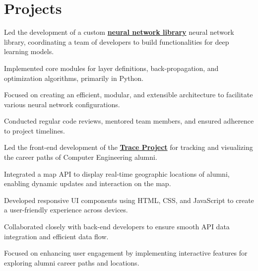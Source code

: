 \documentclass[]{deedy-resume-reversed}
\begin{document}
\begin{minipage}[t]{0.60\textwidth}

\section{Projects}
\begin{tightemize}
\item Led the development of a custom \textbf{\href{https://github.com/Dan1543/Neural-Network}{neural network library}} neural network library, coordinating a team of developers to build functionalities for deep learning models.
\item Implemented core modules for layer definitions, back-propagation, and optimization algorithms, primarily in Python.
\item Focused on creating an efficient, modular, and extensible architecture to facilitate various neural network configurations.
\item Conducted regular code reviews, mentored team members, and ensured adherence to project timelines.
\end{tightemize}
\sectionsep

\begin{tightemize}
\item Led the front-end development of the \textbf{\href{https://github.com/Proyecto-TRACE}{Trace Project}} for tracking and visualizing the career paths of Computer Engineering alumni.
\item Integrated a map API to display real-time geographic locations of alumni, enabling dynamic updates and interaction on the map.
\item Developed responsive UI components using HTML, CSS, and JavaScript to create a user-friendly experience across devices.
\item Collaborated closely with back-end developers to ensure smooth API data integration and efficient data flow.
\item Focused on enhancing user engagement by implementing interactive features for exploring alumni career paths and locations.
\end{tightemize}
\sectionsep



\end{minipage}
\end{document}
